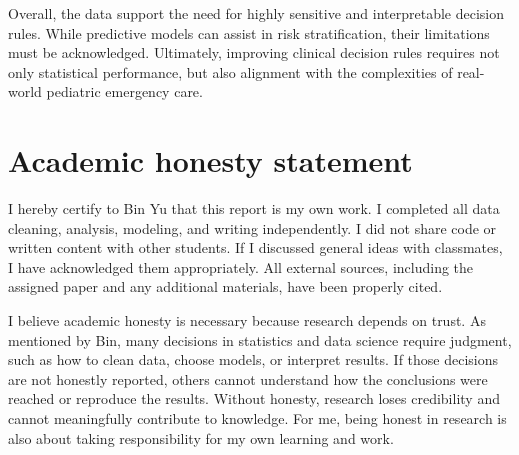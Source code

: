 \documentclass[11pt,letterpaper]{article}
\begin{document}
Overall, the data support the need for highly sensitive and interpretable decision rules. While predictive models can assist in risk stratification, their limitations must be acknowledged. Ultimately, improving clinical decision rules requires not only statistical performance, but also alignment with the complexities of real-world pediatric emergency care.

\section{Academic honesty statement}\label{academic-honesty-statement}

I hereby certify to Bin Yu that this report is my own work. I completed all data cleaning, analysis, modeling, and writing independently. I did not share code or written content with other students. If I discussed general ideas with classmates, I have acknowledged them appropriately. All external sources, including the assigned paper and any additional materials, have been properly cited.

I believe academic honesty is necessary because research depends on trust. As mentioned by Bin, many decisions in statistics and data science require judgment, such as how to clean data, choose models, or interpret results. If those decisions are not honestly reported, others cannot understand how the conclusions were reached or reproduce the results. Without honesty, research loses credibility and cannot meaningfully contribute to knowledge. For me, being honest in research is also about taking responsibility for my own learning and work.

\newpage



\end{document}
